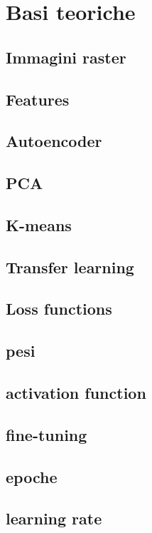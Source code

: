 \chapter{Basi teoriche}
\label{cap:teoria}

\section{Immagini raster}

\section{Features}

\section{Autoencoder}

\section{PCA}

\section{K-means}

\section{Transfer learning}

\section{Loss functions}

\section{pesi}

\section{activation function}

\section{fine-tuning}

\section{epoche}

\section{learning rate}